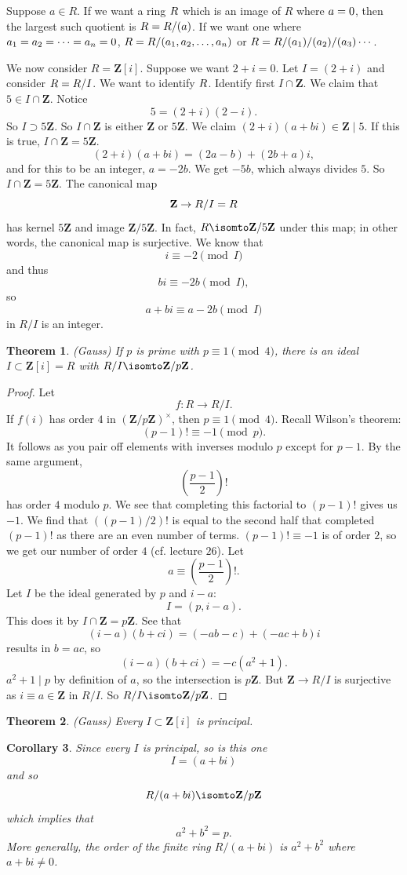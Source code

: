\documentclass[11pt, oneside]{amsart}
\numberwithin{equation}{section}
\newtheorem{theorem}{Theorem}
\numberwithin{theorem}{section}
\newtheorem{corollary}[theorem]{Corollary}
\theoremstyle{definition}
\let\bar\relax
\def\Z{\mathbf{Z}}
\begin{document}
{Suppose $a\in R$. If we want a ring $\bar R$ which is an image of $R$ where $\bar a=0$, then the largest such quotient is $\bar R = R/(a)$. If we want one where $\bar{a_1}=\bar{a_2}=\cdots=\bar{a_n}=0$, $\bar R = R/(a_1,a_2,\hdots,a_n)$ or $\bar R =  R/(a_1)/(a_2)/( a_3) \cdots$.

We now consider $R = \Z[i]$. Suppose we want $2+i = 0$. Let $I = (2+i)$ and consider $\bar R = R/I$. We want to identify $\bar R$. Identify first $I\cap \Z$. We claim that $5\in I\cap \Z$. Notice
$$
5 = (2+i)(2-i).
$$
So $I\supset 5\Z$. So $I\cap \Z$ is either $\Z$ or $5\Z$. We claim $(2+i)(a+bi)\in \Z \mid 5$. If this is true, $I\cap \Z = 5\Z$.  
$$
(2+i)(a+bi) = (2a-b) + (2b+a)i,
$$
and for this to be an integer, $a  = -2b$. We get $-5b$, which always divides $5$. So $I\cap \Z = 5\Z$. The canonical map
$$
\Z \to R/I =\bar R
$$
has kernel $5\Z$ and image $\Z/5\Z$. In fact, $\bar R\isomto \Z/5\Z$ under this map; in other words, the canonical map is surjective. We know that 
$$
i\equiv -2\pmod I
$$
and thus
$$
bi \equiv -2b\pmod I,
$$
so 
$$
a+bi \equiv a-2b\pmod I
$$
in $R/I$ is an integer. 

\begin{theorem}
(Gauss) If $p$ is prime with $p\equiv 1\pmod 4$, there is an ideal $I\subset \Z[i]=R $ with $R/I\isomto\Z/p\Z$. 
\end{theorem}
\begin{proof}
Let
$$
f:R\to R/I.
$$
If $f(i)$ has order $4$ in $(\Z/p\Z)^\times$, then $p\equiv 1\pmod 4$. Recall Wilson's theorem:
$$
(p-1)! \equiv -1\pmod p.
$$
It follows as you pair off elements with inverses modulo $p$ except for $p-1$. By the same argument,
$$
\left(\frac{p-1}{2}\right)!
$$
has order $4$ modulo $p$. We see that completing this factorial to $(p-1)!$ gives us $-1$. We find that $\left(({p-1})/{2}\right)!$ is equal to the second half that completed $(p-1)!$ as there are an even number of terms. $(p-1)!\equiv -1$ is of order $2$, so we get our number of order $4$ (cf. lecture $26$). Let 
$$
a\equiv \left(\frac{p-1}{2}\right)!.
$$
Let $I$ be the ideal generated by $p$ and $i-a$:
$$
I = (p,i-a).
$$
This does it by $I\cap \Z =p\Z$. See that
$$
(i-a)(b+ci) = (-ab-c) + (-ac + b)i
$$
results in $b = ac$, so 
$$
(i-a)(b+ci) = - c (a^2 + 1).
$$
$a^2 + 1 \mid p$ by definition of $a$, so the intersection is $p\Z$. But $\Z\to R/I$ is surjective as $i\equiv a\in\Z$ in $R/I$. So $R/I \isomto \Z/p\Z$.
\end{proof}

\begin{theorem}
(Gauss) Every $I\subset \Z[i]$ is principal.
\end{theorem}
\begin{corollary}
Since every $I$ is principal, so is this one
$$
I = (a+bi)
$$
and so 
$$
R/(a+bi) \isomto \Z/p\Z
$$
which implies that
$$
a^2 + b^2 = p.
$$
More generally, the order of the finite ring $R/(a+bi)$ is $a^2 + b^2$ where $a+bi\neq 0$.
\end{corollary}

}
\end{document}
